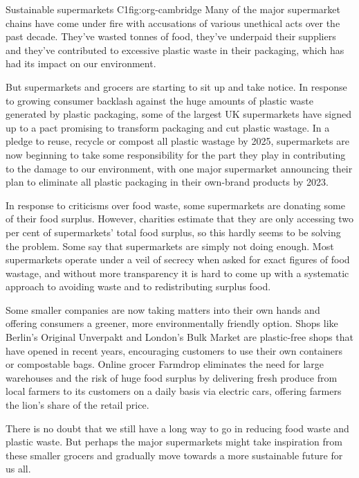 \begin{textexample}{}{Sustainable supermarkets C1}{fig:org-cambridge}
Many of the major supermarket chains have come under fire with accusations of various unethical acts over the past decade. They've wasted tonnes of food, they've underpaid their suppliers and they've contributed to excessive plastic waste in their packaging, which has had its impact on our environment.

But supermarkets and grocers are starting to sit up and take notice. In response to growing consumer backlash against the huge amounts of plastic waste generated by plastic packaging, some of the largest UK supermarkets have signed up to a pact promising to transform packaging and cut plastic wastage. In a pledge to reuse, recycle or compost all plastic wastage by 2025, supermarkets are now beginning to take some responsibility for the part they play in contributing to the damage to our environment, with one major supermarket announcing their plan to eliminate all plastic packaging in their own-brand products by 2023.

In response to criticisms over food waste, some supermarkets are donating some of their food surplus. However, charities estimate that they are only accessing two per cent of supermarkets' total food surplus, so this hardly seems to be solving the problem. Some say that supermarkets are simply not doing enough. Most supermarkets operate under a veil of secrecy when asked for exact figures of food wastage, and without more transparency it is hard to come up with a systematic approach to avoiding waste and to redistributing surplus food.

Some smaller companies are now taking matters into their own hands and offering consumers a greener, more environmentally friendly option. Shops like Berlin's Original Unverpakt and London's Bulk Market are plastic-free shops that have opened in recent years, encouraging customers to use their own containers or compostable bags. Online grocer Farmdrop eliminates the need for large warehouses and the risk of huge food surplus by delivering fresh produce from local farmers to its customers on a daily basis via electric cars, offering farmers the lion's share of the retail price.

There is no doubt that we still have a long way to go in reducing food waste and plastic waste. But perhaps the major supermarkets might take inspiration from these smaller grocers and gradually move towards a more sustainable future for us all.
\end{textexample}

